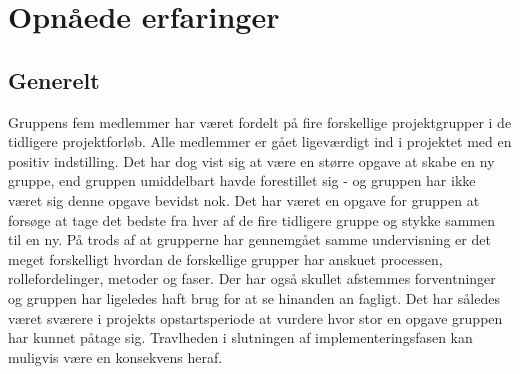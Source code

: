 \section{Opnåede erfaringer}
\label{ch:OpXP}
\subsection{Generelt}
Gruppens fem medlemmer har været fordelt på fire forskellige projektgrupper i de tidligere projektforløb. Alle medlemmer er gået ligeværdigt ind i projektet med en positiv indstilling. Det har dog vist sig at være en større opgave at skabe en ny gruppe, end gruppen umiddelbart havde forestillet sig - og gruppen har ikke været sig denne opgave bevidst nok. Det har været en opgave for gruppen at forsøge at tage det bedste fra hver af de fire tidligere gruppe og stykke sammen til en ny. På trods af at grupperne har gennemgået samme undervisning er det meget forskelligt hvordan de forskellige grupper har anskuet processen, rollefordelinger, metoder og faser. Der har også skullet afstemmes forventninger og gruppen har ligeledes haft brug for at se hinanden an fagligt. Det har således været sværere i projekts opstartsperiode at vurdere hvor stor en opgave gruppen har kunnet påtage sig. Travlheden i slutningen af implementeringsfasen kan muligvis være en konsekvens heraf.
\\

